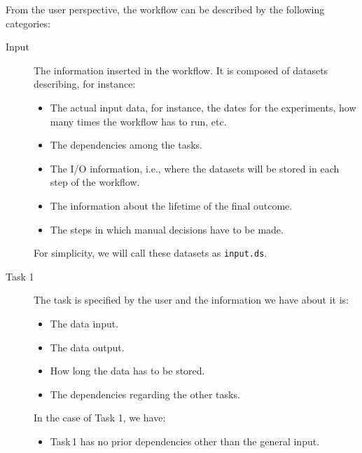 \documentclass[a4paper]{article}
\begin{document}
From the user perspective, the workflow can be described by the following categories:

\begin{description}

\item[Input] The information inserted in the workflow. It is composed of datasets describing, for instance:

\begin{itemize}

\item The actual input data, for instance, the dates for the experiments, how many times the workflow has to run, etc.

\item The dependencies among the tasks.

\item The I/O information, i.e., where the datasets will be stored in each step of the workflow.

\item The information about the lifetime of the final outcome.

\item The steps in which manual decisions have to be made.

\end{itemize}

For simplicity, we will call these datasets as \texttt{input.ds}.

\item[Task 1] The task is specified by the user and the information we have about it is:

\begin{itemize}

\item The data input.

\item The data output.

\item How long the data has to be stored.

\item The dependencies regarding the other tasks.

\end{itemize}

In the case of Task 1, we have:

\begin{itemize}

\item Task\,1 has no prior dependencies other than the general input.


\end{itemize}
\end{description}
\end{document}
